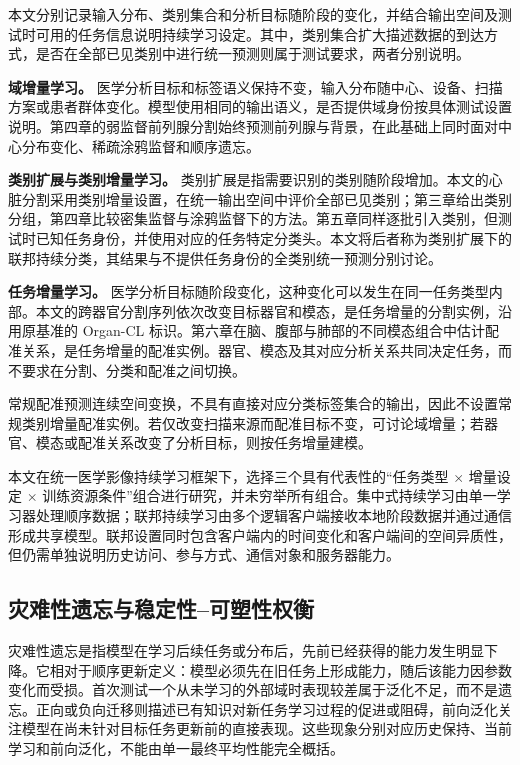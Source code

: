 本文分别记录输入分布、类别集合和分析目标随阶段的变化，并结合输出空间及测试时可用的任务信息说明持续学习设定\cite{vandeven2022three,delange2022continual}。其中，类别集合扩大描述数据的到达方式，是否在全部已见类别中进行统一预测则属于测试要求，两者分别说明。

\textbf{域增量学习。} 医学分析目标和标签语义保持不变，输入分布随中心、设备、扫描方案或患者群体变化。模型使用相同的输出语义，是否提供域身份按具体测试设置说明。第四章的弱监督前列腺分割始终预测前列腺与背景，在此基础上同时面对中心分布变化、稀疏涂鸦监督和顺序遗忘。

\textbf{类别扩展与类别增量学习。} 类别扩展是指需要识别的类别随阶段增加。本文的心脏分割采用类别增量设置，在统一输出空间中评价全部已见类别；第三章给出类别分组，第四章比较密集监督与涂鸦监督下的方法。第五章同样逐批引入类别，但测试时已知任务身份，并使用对应的任务特定分类头。本文将后者称为类别扩展下的联邦持续分类，其结果与不提供任务身份的全类别统一预测分别讨论。

\textbf{任务增量学习。} 医学分析目标随阶段变化，这种变化可以发生在同一任务类型内部。本文的跨器官分割序列依次改变目标器官和模态，是任务增量的分割实例，沿用原基准的 Organ-CL 标识。第六章在脑、腹部与肺部的不同模态组合中估计配准关系，是任务增量的配准实例。器官、模态及其对应分析关系共同决定任务，而不要求在分割、分类和配准之间切换。

常规配准预测连续空间变换，不具有直接对应分类标签集合的输出，因此不设置常规类别增量配准实例。若仅改变扫描来源而配准目标不变，可讨论域增量；若器官、模态或配准关系改变了分析目标，则按任务增量建模。

本文在统一医学影像持续学习框架下，选择三个具有代表性的“任务类型 $\times$ 增量设定 $\times$ 训练资源条件”组合进行研究，并未穷举所有组合。集中式持续学习由单一学习器处理顺序数据；联邦持续学习由多个逻辑客户端接收本地阶段数据并通过通信形成共享模型\cite{yang2024fclsurvey}。联邦设置同时包含客户端内的时间变化和客户端间的空间异质性，但仍需单独说明历史访问、参与方式、通信对象和服务器能力。

\subsection{灾难性遗忘与稳定性--可塑性权衡}
\label{subsec:foundations-forgetting-plasticity}

灾难性遗忘是指模型在学习后续任务或分布后，先前已经获得的能力发生明显下降。它相对于顺序更新定义：模型必须先在旧任务上形成能力，随后该能力因参数变化而受损。首次测试一个从未学习的外部域时表现较差属于泛化不足，而不是遗忘。正向或负向迁移则描述已有知识对新任务学习过程的促进或阻碍，前向泛化关注模型在尚未针对目标任务更新前的直接表现。这些现象分别对应历史保持、当前学习和前向泛化，不能由单一最终平均性能完全概括\cite{hadsell2020embracing,delange2022continual}。

